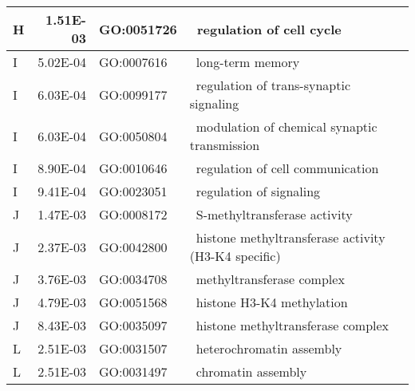 \begin{longtable}{|l|r|l|l|}
\hline
H                & 1.51E-03                                       & GO:0051726       & ~regulation of cell cycle                                             \\
\hline
I                & 5.02E-04                                       & GO:0007616       & ~long-term memory                                                     \\
\hline
I                & 6.03E-04                                       & GO:0099177       & ~regulation of trans-synaptic signaling                               \\
\hline
I                & 6.03E-04                                       & GO:0050804       & ~modulation of chemical synaptic transmission                         \\
\hline
I                & 8.90E-04                                       & GO:0010646       & ~regulation of cell communication                                     \\
\hline
I                & 9.41E-04                                       & GO:0023051       & ~regulation of signaling                                              \\
\hline
J                & 1.47E-03                                       & GO:0008172       & ~S-methyltransferase activity                                         \\
\hline
J                & 2.37E-03                                       & GO:0042800       & ~histone methyltransferase activity (H3-K4 specific)                  \\
\hline
J                & 3.76E-03                                       & GO:0034708       & ~methyltransferase complex                                            \\
\hline
J                & 4.79E-03                                       & GO:0051568       & ~histone H3-K4 methylation                                            \\
\hline
J                & 8.43E-03                                       & GO:0035097       & ~histone methyltransferase complex                                    \\
\hline
L                & 2.51E-03                                       & GO:0031507       & ~heterochromatin assembly                                             \\
\hline
L                & 2.51E-03                                       & GO:0031497       & ~chromatin assembly                                                   \\

\end{longtable}

